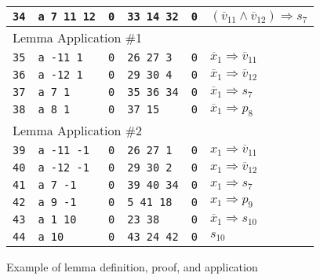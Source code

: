 \documentclass[twoside,11pt]{article}
\newcommand{\obar}[1]{\overline{#1}}
\newcommand{\imply}{\Rightarrow}
\newcommand{\rtext}[1]{\textcolor{midred}{\texttt{#1}}}
\begin{document}
\begin{figure}
\begin{tabular}{llllll}
\rtext{34} & \texttt{a 7 11 12} & \texttt{0} & \rtext{33 14 32} & \texttt{0} & $(\obar{v}_{11} \land \obar{v}_{12}) \imply s_{7}$ \\
\midrule
\multicolumn{6}{l}{Lemma Application \#1} \\
\rtext{35} & \texttt{a -11 1} & \texttt{0} & \rtext{26 27 3} & \texttt{0} & $\obar{x}_1 \imply \obar{v}_{11}$ \\
\rtext{36} & \texttt{a -12 1} & \texttt{0} & \rtext{29 30 4} & \texttt{0} & $\obar{x}_1 \imply \obar{v}_{12}$ \\
\rtext{37} & \texttt{a 7 1} & \texttt{0} & \rtext{35 36 34} & \texttt{0} & $\obar{x}_1 \imply s_7$ \\
\midrule
\rtext{38} & \texttt{a 8 1} & \texttt{0} & \rtext{37 15} & \texttt{0} & $\obar{x}_1 \imply p_8$ \\
\midrule
\multicolumn{6}{l}{Lemma Application \#2} \\
\rtext{39} & \texttt{a -11 -1} & \texttt{0} & \rtext{26 27 1} & \texttt{0} & ${x}_1 \imply \obar{v}_{11}$ \\
\rtext{40} & \texttt{a -12 -1} & \texttt{0} & \rtext{29 30 2} & \texttt{0} & ${x}_1 \imply \obar{v}_{12}$ \\
\rtext{41} & \texttt{a 7 -1} & \texttt{0} & \rtext{39 40 34} & \texttt{0} & ${x}_1 \imply s_7$ \\
\midrule
\rtext{42} & \texttt{a 9 -1} & \texttt{0} & \rtext{5 41 18} & \texttt{0} & ${x}_1 \imply p_9$ \\
\rtext{43} & \texttt{a 1 10} & \texttt{0} & \rtext{23 38} & \texttt{0} & $\obar{x}_1 \imply s_{10}$  \\
\rtext{44} & \texttt{a 10} & \texttt{0} & \rtext{43 24 42} & \texttt{0} & $s_{10}$ \\
\bottomrule
\end{tabular}
\caption{Example of lemma definition, proof, and application}
\label{fig:eg4:lemmas}
\end{figure}
\end{document}
